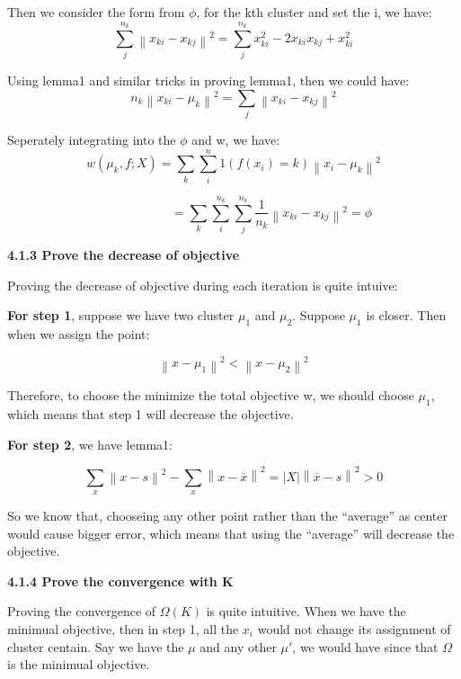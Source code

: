 \documentclass{article} %
\newcommand{\norm}[1]{\left\lVert #1 \right\rVert}
\newcommand{\abs}[1]{\left\lvert #1 \right\rvert}
\begin{document}
Then we consider the form from $\phi$, for the kth cluster and set the i, we have:
\begin{equation}
\sum_j^{n_k} \norm{x_{ki} - x_{kj}}^2 =
\sum_j^{n_k} x_{ki}^2 - 2x_{ki} x_{kj} + x_{ki}^2
\end{equation}

Using lemma1 and similar tricks in proving lemma1, then we could have:
\begin{equation}
n_k \norm{x_{ki} - \mu_k}^2 = \sum_j \norm{x_{ki} - x_{kj}}^2
\end{equation}

Seperately integrating into the $\phi$ and w, we have:
\begin{equation}
w (\mu_k, f; X) = \sum_k \sum_i^n 1(f(x_i) = k) \norm{x_i - \mu_k}^2
\end{equation}

\begin{equation}
\qquad \qquad \qquad
= \sum_k \sum_i^{n_k} \sum_j^{n_k} \frac{1}{n_k} \norm{x_{ki} - x_{kj}}^2 = \phi
\end{equation}

\textbf{4.1.3 Prove the decrease of objective}

Proving the decrease of objective during each iteration is quite intuive:

\textbf{For step 1}, suppose we have two cluster $\mu_1$ and $\mu_2$. Suppose $\mu_1$ is
closer. Then when we assign the point:

\begin{equation}
\norm{x - \mu_1}^2 < \norm{x - \mu_2}^2
\end{equation}

Therefore, to choose the minimize the total objective w, we should choose
$\mu_1$, which means that step 1 will decrease the objective.

\textbf{For step 2}, we have lemma1:

\begin{equation}
\sum_x \norm{x - s}^2 - \sum_x \norm{x - \bar{x}}^2 =
\abs{X} \norm{\bar{x}-s}^2 > 0
\end{equation}

So we know that, chooseing any other point rather than the ``average'' as center
would cause bigger error, which means that using the ``average'' will decrease
the objective.

\textbf{4.1.4 Prove the convergence with K}

Proving the convergence of $\Omega (K)$ is quite intuitive. When we have the
minimual objective, then in step 1, all the $x_i$ would not change its
assignment of cluster centain. Say we have the $\mu$ and any other $\mu'$, we
would have since that $\Omega$ is the minimual objective.
\end{document}
